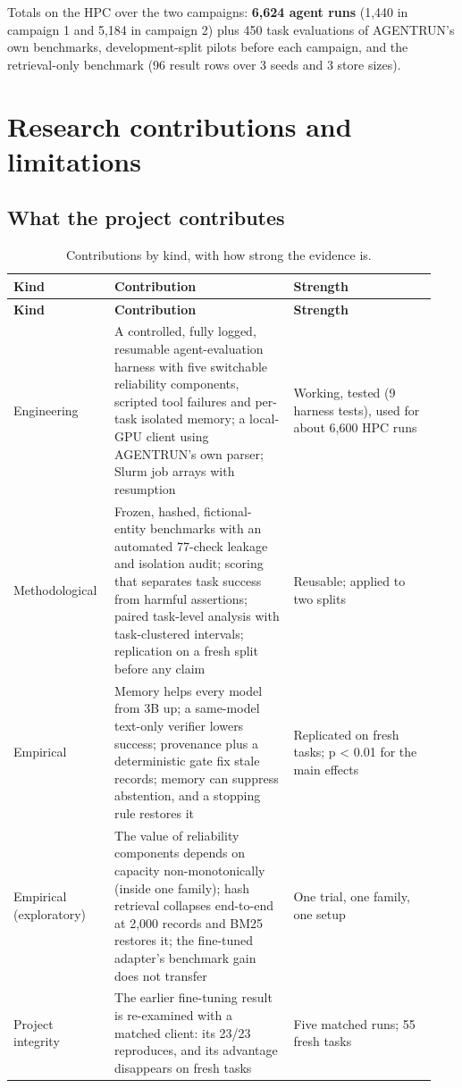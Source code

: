 \documentclass[10.5pt,a4paper,oneside]{report}
\begin{document}
Totals on the HPC over the two campaigns: \textbf{6,624 agent runs} (1,440 in campaign 1 and 5,184 in campaign 2) plus 450 task evaluations of AGENTRUN's own benchmarks, development-split pilots before each campaign, and the retrieval-only benchmark (96 result rows over 3 seeds and 3 store sizes).

\clearpage
\chapter{Research contributions and limitations}
\section{What the project contributes}
\begingroup\small\setlength{\tabcolsep}{4pt}\renewcommand{\arraystretch}{1.18}
\begin{longtable}{>{\raggedright\arraybackslash}p{0.210\linewidth}>{\raggedright\arraybackslash}p{0.405\linewidth}>{\raggedright\arraybackslash}p{0.326\linewidth}}
\caption{Contributions by kind, with how strong the evidence is.}\\
\toprule
\textbf{Kind} & \textbf{Contribution} & \textbf{Strength} \\
\midrule
\endfirsthead
\toprule
\textbf{Kind} & \textbf{Contribution} & \textbf{Strength} \\
\midrule
\endhead
\bottomrule
\endlastfoot
Engineering & A controlled, fully logged, resumable agent-evaluation harness with five switchable reliability components, scripted tool failures and per-task isolated memory; a local-GPU client using AGENTRUN's own parser; Slurm job arrays with resumption & Working, tested (9 harness tests), used for about 6,600 HPC runs \\
Methodological & Frozen, hashed, fictional-entity benchmarks with an automated 77-check leakage and isolation audit; scoring that separates task success from harmful assertions; paired task-level analysis with task-clustered intervals; replication on a fresh split before any claim & Reusable; applied to two splits \\
Empirical & Memory helps every model from 3B up; a same-model text-only verifier lowers success; provenance plus a deterministic gate fix stale records; memory can suppress abstention, and a stopping rule restores it & Replicated on fresh tasks; p < 0.01 for the main effects \\
Empirical (exploratory) & The value of reliability components depends on capacity non-monotonically (inside one family); hash retrieval collapses end-to-end at 2,000 records and BM25 restores it; the fine-tuned adapter's benchmark gain does not transfer & One trial, one family, one setup \\
Project integrity & The earlier fine-tuning result is re-examined with a matched client: its 23/23 reproduces, and its advantage disappears on fresh tasks & Five matched runs; 55 fresh tasks \\
\end{longtable}
\endgroup
\end{document}
